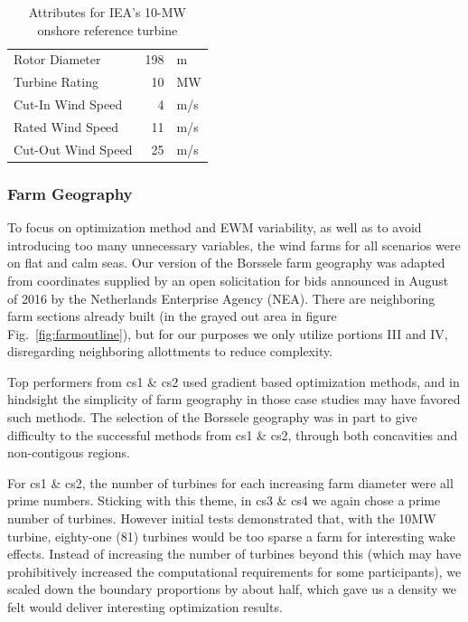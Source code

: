 	\begin{table}[H]
		\begin{center}
			\caption{Attributes for IEA's 10-MW onshore reference turbine}
			\label{tab:turb-att}
			\begin{tabular}{@{}lrl@{}}
			\toprule
				Rotor Diameter & 198 & m \\ 
				Turbine Rating & 10 & MW \\ 
				Cut-In Wind Speed & 4 & m/s \\ 
				Rated Wind Speed & 11 & m/s \\ 
				Cut-Out Wind Speed & 25 & m/s \\
			\bottomrule
			\end{tabular}
		\end{center}
	\end{table}
	
\subsubsection{Farm Geography}\label{sec:farmgeog}

	To focus on optimization method and EWM variability, as well as to avoid introducing too many unnecessary variables, the wind farms for all scenarios were on flat and calm seas.
	Our version of the Borssele farm geography was adapted from coordinates supplied by an open solicitation for bids announced in August of 2016 by the Netherlands Enterprise Agency (NEA)\cite{BorsseleAnnouncement}.
	There are neighboring farm sections already built (in the grayed out area in figure Fig.~\ref{fig:farmoutline}), but for our purposes we only utilize portions III and IV, disregarding neighboring allottments to reduce complexity.

	Top performers from cs1 \& cs2 used gradient based optimization methods, and in hindsight the simplicity of farm geography in those case studies may have favored such methods.
	The selection of the Borssele geography was in part to give difficulty to the successful methods from cs1 \& cs2, through both concavities and non-contigous regions.

	For cs1 \& cs2, the number of turbines for each increasing farm diameter were all prime numbers.
	Sticking with this theme, in cs3 \& cs4 we again chose a prime number of turbines.
	However initial tests demonstrated that, with the 10MW turbine, eighty-one (81) turbines would be too sparse a farm for interesting wake effects.
	Instead of increasing the number of turbines beyond this (which may have prohibitively increased the computational requirements for some participants), we scaled down the boundary proportions by about half, which gave us a density we felt would deliver interesting optimization results.

